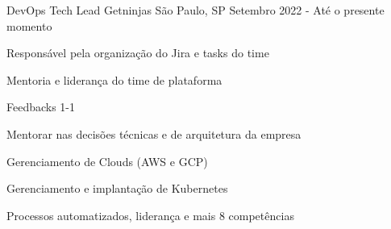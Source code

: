 

\begin{cventries}

\cventry
{DevOps Tech Lead} %
{Getninjas} %
{São Paulo, SP} %
{Setembro 2022 - Até o presente momento} %
{
  \begin{cvitems} %
   \item {Responsável pela organização do Jira e tasks do time}
   \item {Mentoria e liderança do time de plataforma}
   \item {Feedbacks 1-1}
   \item {Mentorar nas decisões técnicas e de arquitetura da empresa}
   \item {Gerenciamento de Clouds (AWS e GCP)}
   \item {Gerenciamento e implantação de Kubernetes}
   \item {Processos automatizados, liderança e mais 8 competências}
  \end{cvitems}
}


\end{cventries}
